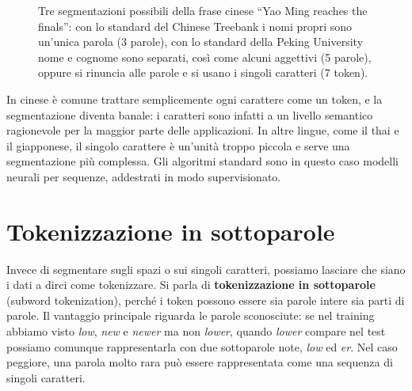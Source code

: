 \begin{figure}[htbp]
\centering
{}
\caption{Tre segmentazioni possibili della frase cinese \enquote{Yao Ming reaches the finals}: con lo standard del Chinese Treebank i nomi propri sono un'unica parola (3 parole), con lo standard della Peking University nome e cognome sono separati, così come alcuni aggettivi (5 parole), oppure si rinuncia alle parole e si usano i singoli caratteri (7 token).}
\label{fig:cinese}
\end{figure}

In cinese è comune trattare semplicemente ogni carattere come un token, e la segmentazione diventa banale: i caratteri sono infatti a un livello semantico ragionevole per la maggior parte delle applicazioni. In altre lingue, come il thai e il giapponese, il singolo carattere è un'unità troppo piccola e serve una segmentazione più complessa. Gli algoritmi standard sono in questo caso modelli neurali per sequenze, addestrati in modo supervisionato.

\section{Tokenizzazione in sottoparole}\label{sec:bpe}
Invece di segmentare sugli spazi o sui singoli caratteri, possiamo lasciare che siano i dati a dirci come tokenizzare. Si parla di \textbf{tokenizzazione in sottoparole} (subword tokenization), perché i token possono essere sia parole intere sia parti di parole. Il vantaggio principale riguarda le parole sconosciute: se nel training abbiamo visto \textit{low}, \textit{new} e \textit{newer} ma non \textit{lower}, quando \textit{lower} compare nel test possiamo comunque rappresentarla con due sottoparole note, \textit{low} ed \textit{er}. Nel caso peggiore, una parola molto rara può essere rappresentata come una sequenza di singoli caratteri.

